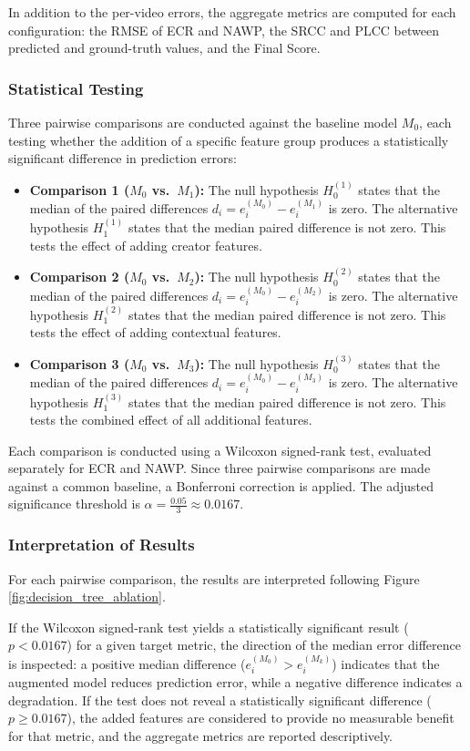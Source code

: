 In addition to the per-video errors, the aggregate metrics are computed for each configuration: the RMSE of ECR and NAWP, the SRCC and PLCC between predicted and ground-truth values, and the Final Score.

\subsubsection{Statistical Testing}
Three pairwise comparisons are conducted against the baseline model $M_0$, each testing whether the addition of a specific feature group produces a statistically significant difference in prediction errors:
\begin{itemize}
    \item \textbf{Comparison 1 ($M_0$ vs.\ $M_1$):} The null hypothesis $H_0^{(1)}$ states that the median of the paired differences $d_i = e_i^{(M_0)} - e_i^{(M_1)}$ is zero. The alternative hypothesis $H_1^{(1)}$ states that the median paired difference is not zero. This tests the effect of adding creator features.
    \item \textbf{Comparison 2 ($M_0$ vs.\ $M_2$):} The null hypothesis $H_0^{(2)}$ states that the median of the paired differences $d_i = e_i^{(M_0)} - e_i^{(M_2)}$ is zero. The alternative hypothesis $H_1^{(2)}$ states that the median paired difference is not zero. This tests the effect of adding contextual features.
    \item \textbf{Comparison 3 ($M_0$ vs.\ $M_3$):} The null hypothesis $H_0^{(3)}$ states that the median of the paired differences $d_i = e_i^{(M_0)} - e_i^{(M_3)}$ is zero. The alternative hypothesis $H_1^{(3)}$ states that the median paired difference is not zero. This tests the combined effect of all additional features.
\end{itemize}
Each comparison is conducted using a Wilcoxon signed-rank test, evaluated separately for ECR and NAWP. Since three pairwise comparisons are made against a common baseline, a Bonferroni correction is applied. The adjusted significance threshold is $\alpha = \frac{0.05}{3} \approx 0.0167$.

\subsubsection{Interpretation of Results}

For each pairwise comparison, the results are interpreted following Figure \ref{fig:decision_tree_ablation}.

If the Wilcoxon signed-rank test yields a statistically significant result ($p < 0.0167$) for a given target metric, the direction of the median error difference is inspected: a positive median difference ($e_i^{(M_0)} > e_i^{(M_k)}$) indicates that the augmented model reduces prediction error, while a negative difference indicates a degradation. If the test does not reveal a statistically significant difference ($p \geq 0.0167$), the added features are considered to provide no measurable benefit for that metric, and the aggregate metrics are reported descriptively.

